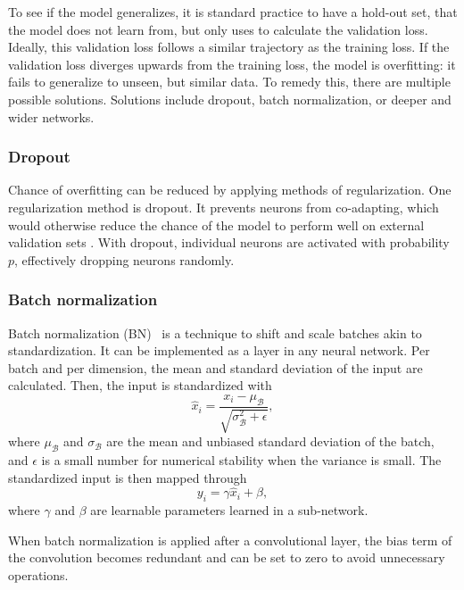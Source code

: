 To see if the model generalizes, it is standard practice to have a hold-out set, that the model does not learn from, but only uses to calculate the validation loss.
Ideally, this validation loss follows a similar trajectory as the training loss.
If the validation loss diverges upwards from the training loss, the model is overfitting: it fails to generalize to unseen, but similar data.
To remedy this, there are multiple possible solutions.
Solutions include dropout, batch normalization, or deeper and wider networks.

\subsubsection{Dropout}\label{sec:dropout}
Chance of overfitting can be reduced by applying methods of regularization.
One regularization method is dropout.
It prevents neurons from co-adapting, which would otherwise reduce the chance of the model to perform well on external validation sets .
With dropout, individual neurons are activated with probability $p$, effectively dropping neurons randomly.

\subsubsection{Batch normalization}\label{sec:bn}
Batch normalization (BN)~ is a technique to shift and scale batches akin to standardization.
It can be implemented as a layer in any neural network.
Per batch and per dimension, the mean and standard deviation of the input are calculated.
Then, the input is standardized with
\begin{equation}
    \hat{x}_i = \frac{x_i - \mu_\mathcal{B}}{\sqrt{\sigma_\mathcal{B}^2 + \epsilon}},
\end{equation}
where $\mu_\mathcal{B}$ and $\sigma_\mathcal{B}$ are the mean and unbiased standard deviation of the batch, and $\epsilon$ is a small number for numerical stability when the variance is small.
The standardized input is then mapped through
\begin{equation}
    y_i = \gamma \hat{x}_i + \beta,
\end{equation}
where $\gamma$ and $\beta$ are learnable parameters learned in a sub-network.

When batch normalization is applied after a convolutional layer, the bias term of the convolution becomes redundant and can be set to zero to avoid unnecessary operations.

